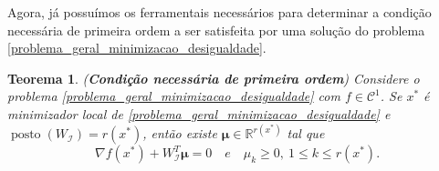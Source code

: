 \documentclass[12pt,a4paper]{scrartcl}
\DeclareMathOperator{\posto}{posto}
\def\RR{\mathds{R}}
\newtheorem{teo}{Teorema}
\theoremstyle{definition}%
\begin{document}
Agora, já possuímos os ferramentais necessários para determinar a condição necessária de primeira ordem a ser satisfeita por uma solução do problema \eqref{problema_geral_minimizacao_desigualdade}.



\begin{teo}(\textbf{Condição necessária de primeira ordem}) \label{teo:condicao_necessaria_1ordem_restricao_desigualdade}
Considere o problema \eqref{problema_geral_minimizacao_desigualdade} com $f \in \mathcal{C}^{1}$. Se $x^{*}$ é minimizador local de \eqref{problema_geral_minimizacao_desigualdade} e $\posto (W_{\mathcal{I}}) = r(x^{*})$, então existe $\boldsymbol{\mu} \in \RR^{r(x^{*})}$ tal que 
\[ \label{eq:condicao_necessaria_1ordem_restricao_desigualdade}
\nabla f(x^{*}) + W_{\mathcal{I}}^{T} \boldsymbol{\mu} =0 \quad e \quad \mu_{k} \geq 0, \ 1\leq k\leq r(x^{*}).
\]
\end{teo}
\end{document}
